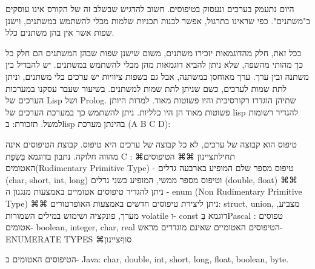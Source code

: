       היום נתעמק בערכים ונעסוק בטיפוסים. חשוב להדגיש שבשלב זה של הקורס אינו עוסקים
      ב"משתנים". כפי שראינו בתרגול, אפשר לבנות תכניות שלמות מבלי להשתמש במשתנים,
      וישנן שפות אשר אין בהן משתנים כלל.

      בכל זאת, חלק מהדוגמאות יזכירו משתנים, משום שישנן שפות שבהן המשתנים הם חלק כל כך
      מהותי מהשפה, שלא ניתן להביא דוגמאות מהן מבלי להשתמש במשתנים. יש להבדיל בין
      משתנה ובין ערך. ערך מאוחסן במשתנה, אבל גם בשפות ציוויות יש ערכים בלי משתנים,
      וניתן לתת שמות לערכים, כשם שניתן לתת שמות למשתנים. בשיעור שעבר עסקנו במערכות
      הערכים של Lisp ושל Prolog. שתיהן הוגדרו רקורסיבית והיו פשוטות מאוד. למרות היותן
      פשוטות מאוד הן היו כלליות. ניתן להשתמש כך במערכת הערכים של lisp להגדיר רשומות
      למשל.
      תזכורת: בlisp בהינתן מערכת (A B C D):

      טיפוס הוא קבוצה של ערכים, לא כל קבוצה של ערכים היא טיפוס. קבוצת הטיפוסים אינה
      מהווה חלוקה.
      נתבון בדוגמא בִּשְׂפַת C :
      ⌘תחילת{ציינון}
      ⌘⌘ הטיפוסים האטומים(Rudimentary Primitive Type)
      - טיפוס מספר שלם המופיע בארבעה גדלים (char,
      short, int, long) וטיפוס מספר ממשי, המופיע
      בשני גדלים (double, float)
      ⌘⌘ ניתן להגדיר טיפוסים אטומיים באמצעות מנגנון ה
      - enum (Non Rudimentary Primitive Type)
      ⌘⌘ ניתן ליצירת טיפוסים חדשים באמצעות האופרטורים: struct, union, מצביע, מערך, פונקציה ושימוש במילים השמורות volatile ו- const
      דוגמא בְּPascal :
      טפוסים אטומים- boolean, integer, char, real
      הטיפוסים האטומיים שאינם מוגדרים מראש- ENUMERATE TYPES
  ⌘סוף{ציינון}

      הטיפוסים האטומים ב- Java:
      char, double, int, short, long, float, boolean, byte.

